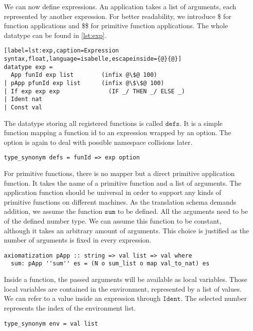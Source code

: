 We can now define expressions.
An application takes a list of arguments, each represented by another expression.
For better readability, we introduce \$ for function applications and \$\$ for primitive function applications.
The whole datatype can be found in \autoref{lst:exp}.
\begin{lstlisting}[label=lst:exp,caption=Expression syntax,float,language=isabelle,escapeinside={@}{@}]
datatype exp =
  App funId exp list        (infix @\$@ 100)
| pApp pfunId exp list      (infix @\$\$@ 100)
| If exp exp exp              (IF _/ THEN _/ ELSE _)
| Ident nat
| Const val
\end{lstlisting}

The datatype storing all registered functions is called $\texttt{defs}$.
It is a simple function mapping a function id to an expression wrapped by an option.
The option is again to deal with possible namespace collisions later.
\begin{lstlisting}[mathescape=true,language=isabelle]
type_synonym defs = funId => exp option
\end{lstlisting}

For primitive functions, there is no mapper but a direct primitive application function.
It takes the name of a primitive function and a list of arguments.
The application function should be universal in order to support any kinds of primitive functions on different machines.
As the translation schema demands addition, we assume the function $\texttt{sum}$ to be defined.
All the arguments need to be of the defined number type.
We can assume this function to be constant, although it takes an arbitrary amount of arguments.
This choice is justified as the number of arguments is fixed in every expression.
\begin{lstlisting}[mathescape=true,language=isabelle]
axiomatization pApp :: string => val list => val where
  sum: pApp ''sum'' es = (N o sum_list o map val_to_nat) es
\end{lstlisting}

Inside a function, the passed arguments will be available as local variables.
Those local variables are contained in the environment, represented by a list of values.
We can refer to a value inside an expression through $\texttt{Ident}$.
The selected number represents the index of the environment list.
\begin{lstlisting}[language=isabelle]
type_synonym env = val list
\end{lstlisting}

